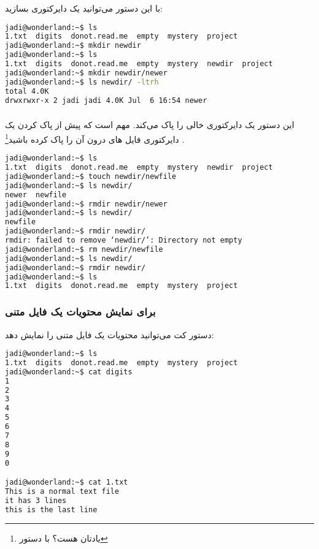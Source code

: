 \subsubsection*{}
با این دستور می‌توانید یک دایرکتوری بسازید:

\begin{latin}
\begin{lstlisting}[language=bash,basicstyle=\ttfamily,linewidth=12cm]
jadi@wonderland:~$ ls
1.txt  digits  donot.read.me  empty  mystery  project
jadi@wonderland:~$ mkdir newdir
jadi@wonderland:~$ ls
1.txt  digits  donot.read.me  empty  mystery  newdir  project
jadi@wonderland:~$ mkdir newdir/newer
jadi@wonderland:~$ ls newdir/ -ltrh
total 4.0K
drwxrwxr-x 2 jadi jadi 4.0K Jul  6 16:54 newer
\end{lstlisting}
\end{latin}

\subsubsection*{}
این دستور یک دایرکتوری خالی را پاک می‌کند. مهم است که پیش از پاک کردن یک دایرکتوری
فایل ‌های درون آن را پاک کرده باشید\footnote{یادتان هست؟ با دستور }
.

\begin{latin}
\begin{lstlisting}[language=bash,basicstyle=\ttfamily,linewidth=12cm]
jadi@wonderland:~$ ls 
1.txt  digits  donot.read.me  empty  mystery  newdir  project
jadi@wonderland:~$ touch newdir/newfile
jadi@wonderland:~$ ls newdir/
newer  newfile
jadi@wonderland:~$ rmdir newdir/newer
jadi@wonderland:~$ ls newdir/
newfile
jadi@wonderland:~$ rmdir newdir/
rmdir: failed to remove ‘newdir/’: Directory not empty
jadi@wonderland:~$ rm newdir/newfile 
jadi@wonderland:~$ ls newdir/
jadi@wonderland:~$ rmdir newdir/
jadi@wonderland:~$ ls
1.txt  digits  donot.read.me  empty  mystery  project
\end{lstlisting}
\end{latin}

\subsubsection*{ برای نمایش محتویات یک فایل متنی}
دستور کت می‌توانید محتویات یک فایل متنی را نمایش دهد:

\begin{latin}
\begin{lstlisting}[language=bash,basicstyle=\ttfamily,linewidth=12cm]
jadi@wonderland:~$ ls 
1.txt  digits  donot.read.me  empty  mystery  project
jadi@wonderland:~$ cat digits 
1
2
3
4
5
6
7
8
9
0

jadi@wonderland:~$ cat 1.txt 
This is a normal text file
it has 3 lines
this is the last line
\end{lstlisting}
\end{latin}

